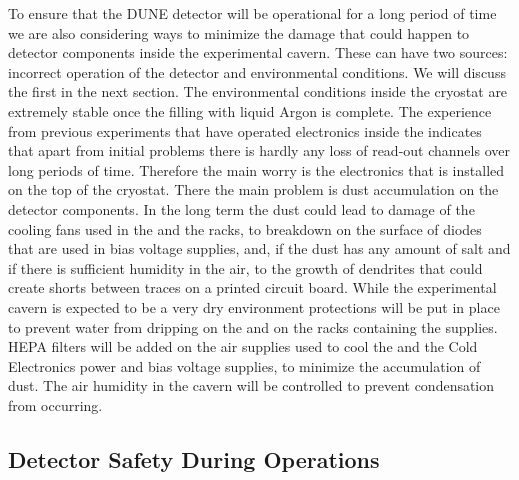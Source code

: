 To ensure that the DUNE detector will be operational for a long
period of time we are also considering ways to minimize the
damage that could happen to detector components inside the 
experimental cavern. These can have two sources: incorrect
operation of the detector and environmental conditions. We
will discuss the first in the next section. The environmental
conditions inside the cryostat are extremely stable once the
filling with liquid Argon is complete. The experience from 
previous experiments that have operated electronics inside the
 indicates that apart from initial problems there
is hardly any loss of read-out channels over long periods of
time. Therefore the main worry is the electronics that is
installed on the top of the cryostat. There the main problem
is dust accumulation on the detector components. In the long
term the dust could lead to damage of the cooling fans used
in the  and the  racks, to breakdown 
on the surface of diodes that are used in bias voltage supplies,
and, if the dust has any amount of salt and if there is sufficient humidity
in the air, to the growth of dendrites that could create 
shorts between traces on a printed circuit board. While the
experimental cavern is expected to be a very dry environment
protections will be put in place to prevent water from 
dripping on the  and on the racks containing the
 supplies. HEPA filters will be added on the
air supplies used to cool the  and the Cold
Electronics power and bias voltage supplies, to minimize
the accumulation of dust. The air humidity in the cavern 
will be controlled to prevent condensation from occurring.

\subsection{Detector Safety During Operations}
\label{sec:fdsp-tpcelec-safety-detops}

